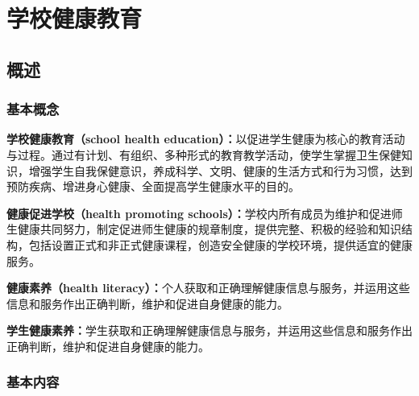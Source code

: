 \chapter{学校健康教育}
\setcounter{chapter}{10}

\section{概述}

\subsection{基本概念}

\begin{defbox}
\textbf{学校健康教育（school health education）：}以促进学生健康为核心的教育活动与过程。通过有计划、有组织、多种形式的教育教学活动，使学生掌握卫生保健知识，增强学生自我保健意识，养成科学、文明、健康的生活方式和行为习惯，达到预防疾病、增进身心健康、全面提高学生健康水平的目的。

\textbf{健康促进学校（health promoting schools）：}学校内所有成员为维护和促进师生健康共同努力，制定促进师生健康的规章制度，提供完整、积极的经验和知识结构，包括设置正式和非正式健康课程，创造安全健康的学校环境，提供适宜的健康服务。

\textbf{健康素养（health literacy）：}个人获取和正确理解健康信息与服务，并运用这些信息和服务作出正确判断，维护和促进自身健康的能力。

\textbf{学生健康素养：}学生获取和正确理解健康信息与服务，并运用这些信息和服务作出正确判断，维护和促进自身健康的能力。
\end{defbox}

\subsection{基本内容}

